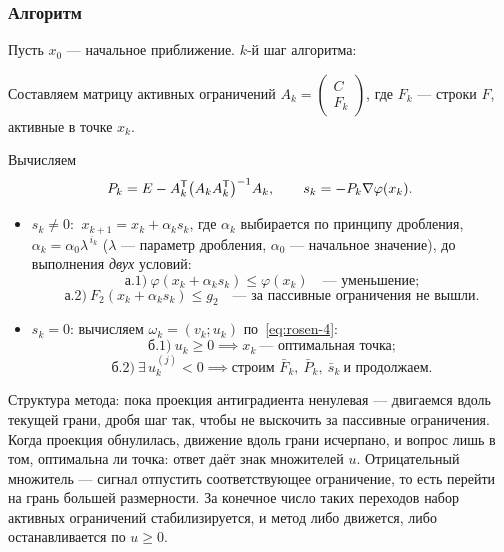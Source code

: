 \subsubsection*{Алгоритм}

Пусть $x_0$ — начальное приближение. $k$-й шаг алгоритма:

\begin{steps}
  \item Составляем матрицу активных ограничений
        $A_k = \begin{pmatrix} C \\ \hline F_k \end{pmatrix}$, где $F_k$ —
        строки $F$, активные в точке $x_k$.
  \item Вычисляем
        \[
          P_k = E - A_k^{\mathsf{T}} \big(A_k A_k^{\mathsf{T}}\big)^{-1} A_k ,
          \qquad
          s_k = -P_k \nabla\varphi(x_k) .
        \]
        \begin{itemize}[left=0pt,nosep]
          \item[а)] $s_k \ne 0$: $\ x_{k+1} = x_k + \alpha_k s_k$, где
                $\alpha_k$ выбирается по принципу дробления,
                $\alpha_k = \alpha_0 \lambda^{\,i_k}$ ($\lambda$ — параметр
                дробления, $\alpha_0$ — начальное значение), до выполнения
                \emph{двух} условий:
                \[
                  \text{а.1)}\ \varphi(x_k + \alpha_k s_k) \le \varphi(x_k)
                  \quad\text{— уменьшение;}
                \]
                \[
                  \text{а.2)}\ F_2(x_k + \alpha_k s_k) \le g_2
                  \quad\text{— за пассивные ограничения не вышли.}
                \]
          \item[б)] $s_k = 0$: вычисляем $\omega_k = (v_k; u_k)$
                по~\eqref{eq:rosen-4}:
                \[
                  \text{б.1)}\ u_k \ge 0 \implies x_k \ \text{— оптимальная точка;}
                \]
                \[
                  \text{б.2)}\ \exists\, u^{(j)}_k < 0 \implies
                  \text{строим } \bar{F}_k,\ \bar{P}_k,\ \bar{s}_k
                  \ \text{и продолжаем.}
                \]
        \end{itemize}
\end{steps}

\begin{idea}
Структура метода: пока проекция антиградиента ненулевая — двигаемся вдоль
текущей грани, дробя шаг так, чтобы не выскочить за пассивные ограничения.
Когда проекция обнулилась, движение вдоль грани исчерпано, и вопрос лишь в том,
оптимальна ли точка: ответ даёт знак множителей $u$. Отрицательный множитель —
сигнал отпустить соответствующее ограничение, то есть перейти на грань большей
размерности. За конечное число таких переходов набор активных ограничений
стабилизируется, и метод либо движется, либо останавливается по $u \ge 0$.
\end{idea}
